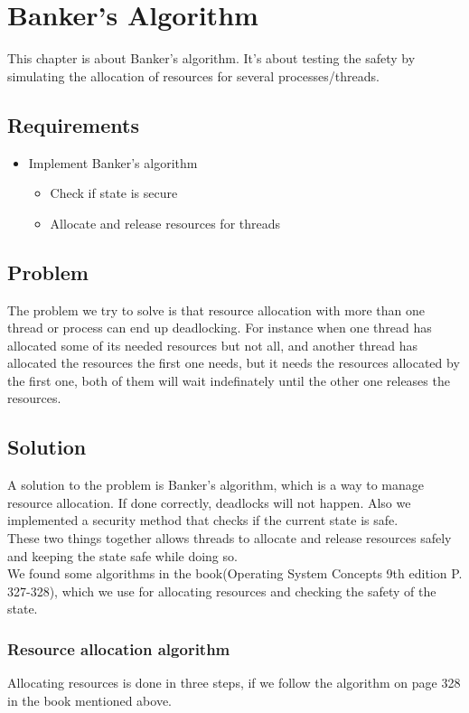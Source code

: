 \chapter{Banker's Algorithm}
This chapter is about Banker's algorithm. It's about testing the safety by simulating the allocation of resources for several processes/threads.

\section{Requirements}
\begin{itemize}
\item Implement Banker's algorithm
\begin{itemize}
\item Check if state is secure
\item Allocate and release resources for threads
\end{itemize}
\end{itemize}

\section{Problem}
The problem we try to solve is that resource allocation with more than one thread or process can end up deadlocking. For instance when one thread has allocated some of its needed resources but not all, and another thread has allocated the resources the first one needs, but it needs the resources allocated by the first one, both of them will wait indefinately until the other one releases the resources.

\section{Solution}
A solution to the problem is Banker's algorithm, which is a way to manage resource allocation. If done correctly, deadlocks will not happen. Also we implemented a security method that checks if the current state is safe.\\

These two things together allows threads to allocate and release resources safely and keeping the state safe while doing so.\\

We found some algorithms in the book(Operating System Concepts 9th edition P. 327-328), which we use for allocating resources and checking the safety of the state.

\subsection{Resource allocation algorithm}
Allocating resources is done in three steps, if we follow the algorithm on page 328 in the book mentioned above.\\

